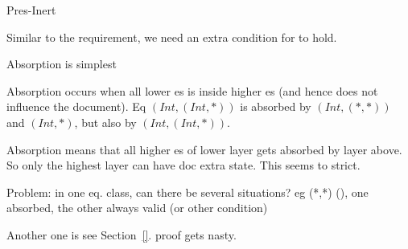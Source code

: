 







		{Pres-Inert}

Similar to the  requirement, we need an extra condition for  to hold.

Absorption is simplest



Absorption occurs when all lower es is inside higher es (and hence does not influence the document). Eq $(Int,(Int,*))$ is absorbed by  $(Int,(*,*))$ and $(Int,*)$, but also by $(Int,(Int,*))$.

Absorption means that all higher es of lower layer gets absorbed by layer above. So only the highest layer can have doc extra state. This seems to strict.

Problem: in one eq. class, can there be several situations? eg (*,*) \dbarr (), one absorbed, the other always valid (or other condition)

Another one is  see Section~\ref{}. proof gets nasty.



